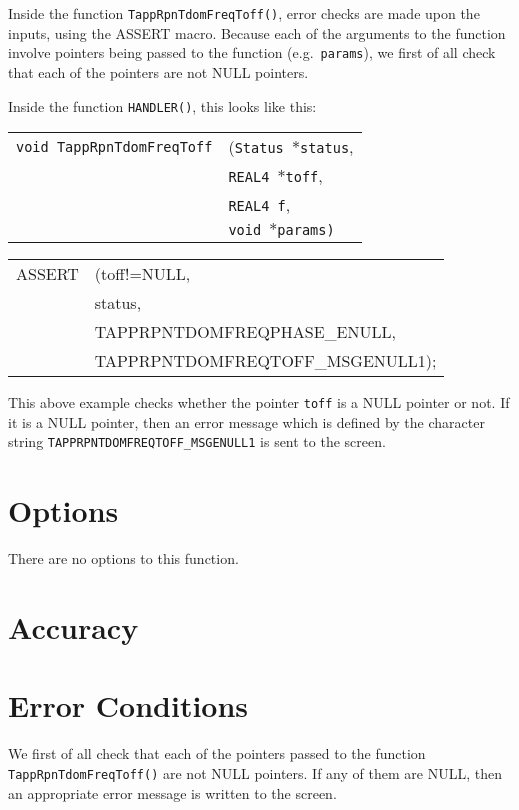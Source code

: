 \documentclass[12pt]{article}
\begin{document}
Inside the function \texttt{TappRpnTdomFreqToff()}, error checks are made upon the inputs, using the ASSERT macro. Because each of the arguments to the function involve pointers being passed to the function (e.g.\ \texttt{params}), we first of all check that each of the pointers are not NULL pointers.

Inside the function \texttt{HANDLER()}, this looks like this:

\vspace{5mm}

\begin{tabular}{ll}
\texttt{void TappRpnTdomFreqToff} & (\texttt{Status $\ast$status}, \\
                        & \texttt{REAL4 $\ast$toff}, \\
			& \texttt{REAL4 f}, \\
                        & \texttt{void $\ast$params)}
\end{tabular}

\begin{tabular}{ll}
ASSERT & (toff!=NULL,  \\
       &  status,    \\
       &  TAPPRPNTDOMFREQPHASE\_ENULL, \\
       &  TAPPRPNTDOMFREQTOFF\_MSGENULL1);
\end{tabular}

\vspace{5mm}

This above example checks whether the pointer \texttt{toff} is a NULL pointer or not.  If it is a NULL pointer, then an error message which is defined by the character string \texttt{TAPPRPNTDOMFREQTOFF\_MSGENULL1} is sent to the screen.





\section{Options}
There are no options to this function.

\section{Accuracy}

\section{Error Conditions}
We first of all check that each of the pointers passed to the function \\ \texttt{TappRpnTdomFreqToff()} are not NULL pointers. If any of them are NULL, then an appropriate error message is written to the screen.
\end{document}
